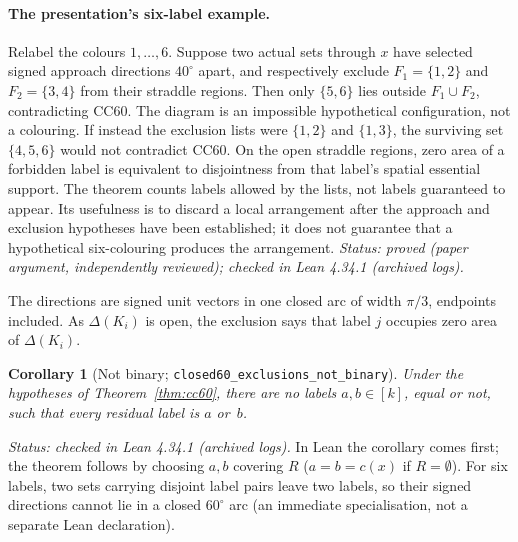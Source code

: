 \documentclass[11pt]{article}
\newtheorem{corollary}[theorem]{Corollary}
\theoremstyle{definition}
\theoremstyle{remark}
\begin{document}
\paragraph{The presentation's six-label example.}
Relabel the colours $1,\dots,6$. Suppose two actual sets through $x$ have
selected signed approach directions $40^\circ$ apart, and respectively exclude
$F_1=\{1,2\}$ and $F_2=\{3,4\}$ from their straddle regions. Then only
$\{5,6\}$ lies outside $F_1\cup F_2$, contradicting CC60. The diagram is an
impossible hypothetical configuration, not a colouring. If instead the
exclusion lists were $\{1,2\}$ and $\{1,3\}$, the surviving set
$\{4,5,6\}$ would not contradict CC60. On the open straddle regions,
zero area of a forbidden label is equivalent to disjointness from that
label's spatial essential support. The theorem counts labels allowed by the
lists, not labels guaranteed to appear. Its usefulness is to discard a local
arrangement after the approach and exclusion hypotheses have been established;
it does not guarantee that a hypothetical six-colouring produces the
arrangement.
\noindent\emph{Status: proved (paper argument, independently reviewed);
checked in Lean 4.34.1 (archived logs).}

The directions are signed unit vectors in one closed arc of width $\pi/3$,
endpoints included. As $\Delta(K_i)$ is open, the exclusion says that
label $j$ occupies zero area of $\Delta(K_i)$.

\begin{corollary}[Not binary; \texttt{closed60\_\allowbreak{}exclusions\_\allowbreak{}not\_\allowbreak{}binary}]\label{cor:notbinary}
Under the hypotheses of Theorem~\ref{thm:cc60}, there are no labels
$a,b\in[k]$, equal or not, such that every residual label is $a$ or~$b$.
\end{corollary}
\noindent\emph{Status: checked in Lean 4.34.1 (archived logs).} In Lean the
corollary comes first; the theorem follows by choosing $a,b$ covering $R$
($a=b=c(x)$ if $R=\emptyset$). For six labels, two sets carrying disjoint
label pairs leave two labels, so their signed directions cannot lie in a
closed $60^\circ$ arc (an immediate specialisation, not a separate Lean
declaration).
\end{document}
